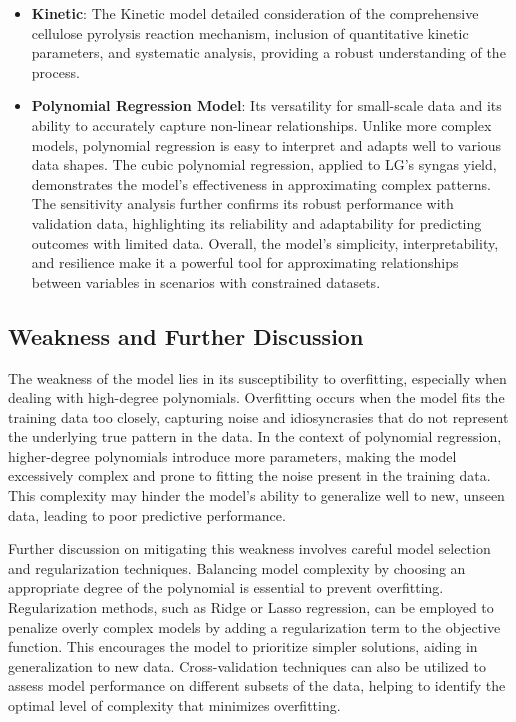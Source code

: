 \documentclass{swmcmthesis}
\begin{document}
\begin{itemize}
    \item \textbf{Kinetic}: The Kinetic model detailed consideration of the comprehensive cellulose pyrolysis reaction mechanism, inclusion of quantitative kinetic parameters, and systematic analysis, providing a robust understanding of the process.
    \item \textbf{Polynomial Regression Model}: Its versatility for small-scale data and its ability to accurately capture non-linear relationships. Unlike more complex models, polynomial regression is easy to interpret and adapts well to various data shapes. The cubic polynomial regression, applied to LG's syngas yield, demonstrates the model's effectiveness in approximating complex patterns. The sensitivity analysis further confirms its robust performance with validation data, highlighting its reliability and adaptability for predicting outcomes with limited data. Overall, the model's simplicity, interpretability, and resilience make it a powerful tool for approximating relationships between variables in scenarios with constrained datasets.
\end{itemize}

\subsection{Weakness and Further Discussion}

The weakness of the model lies in its susceptibility to overfitting, especially when dealing with high-degree polynomials. Overfitting occurs when the model fits the training data too closely, capturing noise and idiosyncrasies that do not represent the underlying true pattern in the data. In the context of polynomial regression, higher-degree polynomials introduce more parameters, making the model excessively complex and prone to fitting the noise present in the training data. This complexity may hinder the model's ability to generalize well to new, unseen data, leading to poor predictive performance.

Further discussion on mitigating this weakness involves careful model selection and regularization techniques. Balancing model complexity by choosing an appropriate degree of the polynomial is essential to prevent overfitting. Regularization methods, such as Ridge or Lasso regression, can be employed to penalize overly complex models by adding a regularization term to the objective function. This encourages the model to prioritize simpler solutions, aiding in generalization to new data. Cross-validation techniques can also be utilized to assess model performance on different subsets of the data, helping to identify the optimal level of complexity that minimizes overfitting.
\end{document}

